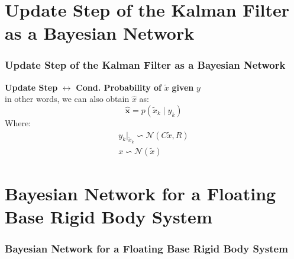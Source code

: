 \documentclass[xcolor=dvipsnames]{beamer}
\begin{document}
\section{Update Step of the Kalman Filter as a Bayesian Network}
\begin{frame}
  \frametitle{Update Step of the Kalman Filter as a Bayesian Network}
  \textbf{Update Step} $\leftrightarrow $ \textbf{Cond. Probability of} $\tilde{x}$ \textbf{given} $y$ \\
  in other words, we can also obtain $\hat{x}$ as:
  \begin{equation}
  \mathbf{\hat{x}} = p(\tilde{x}_k \mid y_k)
  \end{equation}
  Where:
  \begin{align}
   y_k \vert_{\tilde{x}_k} \backsim \mathcal{N}(C\tilde{x}, R) \\
   x \backsim \mathcal{N}(\tilde{x})
  \end{align}

\end{frame}


\section{Bayesian Network for a Floating Base Rigid Body System}
\begin{frame}
 \frametitle{Bayesian Network for a Floating Base Rigid Body System}
 

\end{frame}

\end{document}
